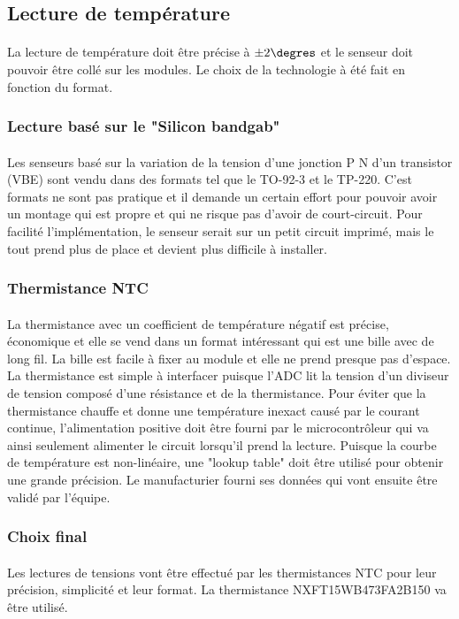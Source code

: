 

\subsection{Lecture de température}
	\paragraph*{}
	La lecture de température doit être précise à $\pm 2\degres$ et le senseur doit pouvoir être collé sur les modules. Le choix de la technologie à été fait en fonction du format. 
	
	\subsubsection*{Lecture basé sur le "Silicon bandgab"}
	\paragraph*{}
	Les senseurs basé sur la variation de la tension d'une jonction P N d'un transistor (VBE) sont vendu dans des formats tel que le TO-92-3 et le TP-220. C'est formats ne sont pas pratique et il demande un certain effort pour pouvoir avoir un montage qui est propre et qui ne risque pas d'avoir de court-circuit. Pour facilité l'implémentation, le senseur serait sur un petit circuit imprimé, mais le tout prend plus de place et devient plus difficile à installer.
	
	\subsubsection*{Thermistance NTC}
	\paragraph*{}
	La thermistance avec un coefficient de température négatif est précise, économique et elle se vend dans un format intéressant qui est une bille avec de long fil. La bille est facile à fixer au module et elle ne prend presque pas d'espace. La thermistance est simple à interfacer puisque l'ADC lit la tension d'un diviseur de tension composé d'une résistance et de la thermistance. Pour éviter que la thermistance chauffe et donne une température inexact causé par le courant continue, l'alimentation positive doit être fourni par le microcontrôleur qui va ainsi seulement alimenter le circuit lorsqu'il prend la lecture. Puisque la courbe de température est non-linéaire, une "lookup table" doit être utilisé pour obtenir une grande précision. Le manufacturier fourni ses données qui vont ensuite être validé par l'équipe.  
	
	\subsubsection*{Choix final}
	\paragraph*{}
	Les lectures de tensions vont être effectué par les thermistances NTC pour leur précision, simplicité et leur format. La thermistance NXFT15WB473FA2B150 va être utilisé.	